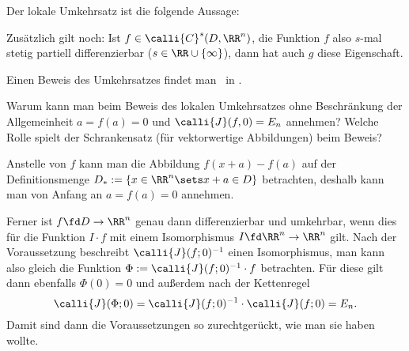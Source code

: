 \begin{antwort}
  Der lokale Umkehrsatz ist die folgende Aussage: 

  \medskip
  \noindent{}\noindent
  Zusätzlich gilt noch: Ist $f\in \calli{C}^s (D,\RR^n)$, die Funktion $f$ also 
  $s$-mal stetig partiell differenzierbar ($s\in \RR \cup \{\infty \}$), dann 
  hat auch $g$ diese Eigenschaft. 

  \medskip
  \noindent
  Einen Beweis des Umkehrsatzes findet man \zB\ in \citep{Arens}.\AntEnd
\end{antwort}

\begin{frage}
  Warum kann man beim Beweis des lokalen Umkehrsatzes ohne Beschränkung der 
  Allgemeinheit $a=f(a)=0$ und $\calli{J}(f,0)=E_n$ annehmen? Welche 
  Rolle spielt der Schrankensatz (für vektorwertige Abbildungen) beim Beweis?
\end{frage}

\begin{antwort}
  Anstelle von $f$ kann man die Abbildung $f(x+a)-f(a)$ auf der 
  Definitionsmenge $D_* := \{ x\in \RR^n \sets x+a\in D \}$ betrachten, 
  deshalb kann man von Anfang an $a=f(a)=0$ annehmen. 

  Ferner ist $f \fd D \to \RR^n$ genau dann differenzierbar und umkehrbar, 
  wenn dies für die Funktion $I\cdot f$ mit einem Isomorphismus 
  $I \fd \RR^n\to \RR^n$ gilt. Nach der Voraussetzung beschreibt  
  $\calli{J}(f;0)^{-1}$ einen Isomorphismus, man kann also 
  gleich die Funktion 
  $\Phi := \calli{J}(f;0)^{-1} \cdot f$ betrachten. Für diese 
  gilt dann ebenfalls $\Phi(0)=0$ und außerdem nach der Kettenregel
  \[
  \calli{J} ( \Phi; 0 ) = \calli{J}(f;0)^{-1} \cdot \calli{J}( f;0 ) = E_n. 
  \]
  Damit sind dann die Voraussetzungen so zurechtgerückt, wie man 
  sie haben wollte. 
  \AntEnd
\end{antwort}

